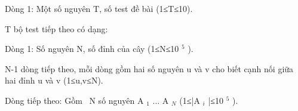 Dòng 1: Một số nguyên T, số test đề bài (1≤T≤10).

T bộ test tiếp theo có dạng:

Dòng 1: Số nguyên N, số đỉnh của cây (1≤N≤10 $^ 5 $ ).

N-1 dòng tiếp theo, mỗi dòng gồm hai số nguyên u và v cho biết cạnh nối giữa hai đỉnh u và v (1≤u,v≤N).

Dòng tiếp theo: Gồm  N số nguyên A $_ 1 $ ... A $_ N $ (1≤|A $_ i $ |≤10 $^ 5 $ ).

\